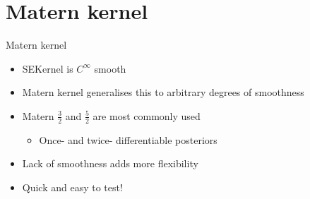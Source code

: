 \documentclass[presentation]{beamer}
\begin{document}
\section{Matern kernel}
\label{sec:org57a00c2}
\begin{frame}[label={sec:org99ae610}]{Matern kernel}
\begin{itemize}
\item SEKernel is \(C^\infty\) smooth
\item Matern kernel generalises this to arbitrary degrees of smoothness
\item Matern \(\frac{3}{2}\) and \(\frac{5}{2}\) are most commonly used
\begin{itemize}
\item Once- and twice- differentiable posteriors
\end{itemize}
\item Lack of smoothness adds more flexibility
\item Quick and easy to test!
\end{itemize}
\end{frame}
\end{document}
